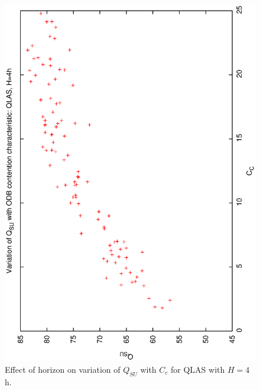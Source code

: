 \begin{figure}[h]

\begin{center}
 \includegraphics[scale=0.5, angle=-90]{figures/qsucc_ql4.eps}
 \caption[Effect of horizon on variation of $Q_{SU}$ with $C_c$ for QLAS with $H=4$h.] 
   {Effect of horizon on variation of $Q_{SU}$ with $C_c$ for QLAS with $H=4$h.} 
\label{fig:qsucc_ql4}
\end{center}
\end{figure}

